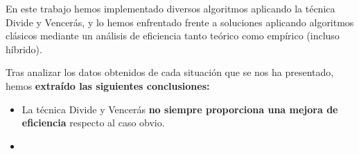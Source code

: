 En este trabajo hemos implementado diversos algoritmos aplicando
la técnica Divide y Vencerás, y lo hemos enfrentado frente a soluciones aplicando
algoritmos clásicos mediante un análisis de eficiencia tanto teórico como empírico 
(incluso híbrido). 

Tras analizar los datos obtenidos de cada situación que se nos ha presentado,
hemos \textbf{extraído las siguientes conclusiones: }

\begin{itemize}
    \item La técnica Divide y Vencerás \textbf{no siempre proporciona una mejora de eficiencia}
    respecto al caso obvio. 
    \item 
\end{itemize}